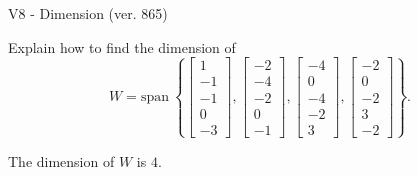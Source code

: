 \begin{exercise}
  \begin{exerciseTitle}V8 - Dimension (ver. 865)\end{exerciseTitle}
  \begin{exerciseStatement}
    Explain how to find the dimension of 
\[W=\mathrm{span}\ \left\{\left[\begin{array}{r}
1 \\
-1 \\
-1 \\
0 \\
-3
\end{array}\right] , \left[\begin{array}{r}
-2 \\
-4 \\
-2 \\
0 \\
-1
\end{array}\right] , \left[\begin{array}{r}
-4 \\
0 \\
-4 \\
-2 \\
3
\end{array}\right] , \left[\begin{array}{r}
-2 \\
0 \\
-2 \\
3 \\
-2
\end{array}\right]\right\}.\]



  \end{exerciseStatement}
  \begin{exerciseAnswer}
   The dimension of \(W\) is  \(4\).
  


  \end{exerciseAnswer}
\end{exercise}